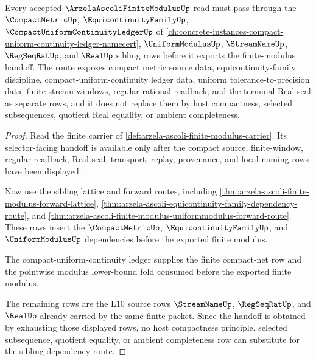 \begin{theorem}
\label{thm:arzela-ascoli-finite-modulus-sibling-dependency-route}
Every accepted $\ArzelaAscoliFiniteModulusUp$ read must pass through the $\CompactMetricUp$, $\EquicontinuityFamilyUp$, $\CompactUniformContinuityLedgerUp$ of \autoref{ch:concrete-instances-compact-uniform-continuity-ledger-namecert}, $\UniformModulusUp$, $\StreamNameUp$, $\RegSeqRatUp$, and $\RealUp$ sibling rows before it exports the finite-modulus handoff. The route exposes compact metric source data, equicontinuity-family discipline, compact-uniform-continuity ledger data, uniform tolerance-to-precision data, finite stream windows, regular-rational readback, and the terminal Real seal as separate rows, and it does not replace them by host compactness, selected subsequences, quotient Real equality, or ambient completeness.
\end{theorem}
\begin{proof}
Read the finite carrier of \autoref{def:arzela-ascoli-finite-modulus-carrier}. Its selector-facing handoff is available only after the compact source, finite-window, regular readback, Real seal, transport, replay, provenance, and local naming rows have been displayed.

Now use the sibling lattice and forward routes, including \autoref{thm:arzela-ascoli-finite-modulus-forward-lattice}, \autoref{thm:arzela-ascoli-equicontinuity-family-dependency-route}, and \autoref{thm:arzela-ascoli-finite-modulus-uniformmodulus-forward-route}. These rows insert the $\CompactMetricUp$, $\EquicontinuityFamilyUp$, and $\UniformModulusUp$ dependencies before the exported finite modulus.

The compact-uniform-continuity ledger supplies the finite compact-net row and the pointwise modulus lower-bound fold consumed before the exported finite modulus.

The remaining rows are the L10 source rows $\StreamNameUp$, $\RegSeqRatUp$, and $\RealUp$ already carried by the same finite packet. Since the handoff is obtained by exhausting those displayed rows, no host compactness principle, selected subsequence, quotient equality, or ambient completeness row can substitute for the sibling dependency route.
\end{proof}
